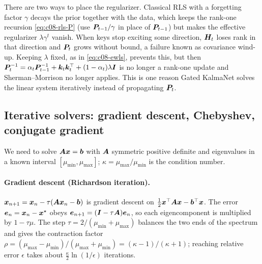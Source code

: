 There are two ways to place the regularizer. Classical RLS with a forgetting factor $\gamma$ decays
the prior together with the data, which keeps the rank-one recursion
\eqref{eq:c08-rls-P} (use $\bm{P}_{t-1}/\gamma$ in place of $\bm{P}_{t-1}$) but makes the effective
regularizer $\lambda\gamma^t$ vanish. When keys stop exciting some direction, $\bm{H}_t$ loses rank
in that direction and $\bm{P}_t$ grows without bound, a failure known as covariance wind-up. Keeping
$\lambda$ fixed, as in \eqref{eq:c08-ewls}, prevents this, but then
$\bm{P}_t^{-1}=\alpha_t\bm{P}_{t-1}^{-1}+\bm{k}_t\bm{k}_t^{\top}+(1-\alpha_t)\lambda\bm{I}$ is no longer a rank-one
update and Sherman--Morrison no longer applies. This is one reason Gated KalmaNet solves the linear
system iteratively instead of propagating $\bm{P}_t$.

\subsection{Iterative solvers: gradient descent, Chebyshev, conjugate gradient}\label{sec:c08-solvers}

We need to solve $\bm{A}\bm{x}=\bm{b}$ with $\bm{A}$ symmetric positive definite and eigenvalues in a known
interval $[\mu_{\min},\mu_{\max}]$; $\kappa=\mu_{\max}/\mu_{\min}$ is the condition number.

\paragraph{Gradient descent (Richardson iteration).} $\bm{x}_{n+1}=\bm{x}_n-\tau(\bm{A}\bm{x}_n-\bm{b})$ is
gradient descent on $\tfrac12\bm{x}^{\top}\bm{A}\bm{x}-\bm{b}^{\top}\bm{x}$. The error $\bm{e}_n=\bm{x}_n-\bm{x}^\star$ obeys
$\bm{e}_{n+1}=(\bm{I}-\tau\bm{A})\bm{e}_n$, so each eigencomponent is multiplied by $1-\tau\mu$. The step
$\tau=2/(\mu_{\min}+\mu_{\max})$ balances the two ends of the spectrum and gives the contraction
factor $\rho=(\mu_{\max}-\mu_{\min})/(\mu_{\max}+\mu_{\min})=(\kappa-1)/(\kappa+1)$; reaching
relative error $\epsilon$ takes about $\tfrac{\kappa}{2}\ln(1/\epsilon)$ iterations.


